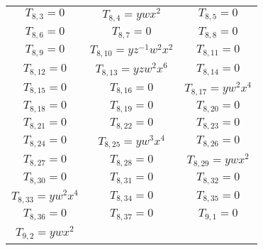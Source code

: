 \documentclass[12pt]{memoireuqam1.3}
\begin{document}
\begin{longtable}{|c|c|c|}
$T_{8,3}= 0$&

$T_{8,4}= ywx^2$&

$T_{8,5}= 0$\\

$T_{8,6}= 0$&

$T_{8,7}= 0$&

$T_{8,8}= 0$\\

$T_{8,9}= 0$&

$T_{8,10}= yz^{-1}w^2x^2$&

$T_{8,11}= 0$\\

$T_{8,12}= 0$&

$T_{8,13}= yzw^2x^6$&

$T_{8,14}= 0$\\

$T_{8,15}= 0$&

$T_{8,16}= 0$&

$T_{8,17}= yw^2x^4$\\

$T_{8,18}= 0$&

$T_{8,19}= 0$&

$T_{8,20}= 0$\\

$T_{8,21}= 0$&

$T_{8,22}= 0$&

$T_{8,23}= 0$\\

$T_{8,24}= 0$&

$T_{8,25}= yw^3x^4$&

$T_{8,26}= 0$\\

$T_{8,27}= 0$&

$T_{8,28}= 0$&

$T_{8,29}= ywx^2$\\

$T_{8,30}= 0$&

$T_{8,31}= 0$&

$T_{8,32}= 0$\\

$T_{8,33}= yw^2x^4$&

$T_{8,34}= 0$&

$T_{8,35}= 0$\\

$T_{8,36}= 0$&

$T_{8,37}= 0$&

$T_{9,1}= 0$\\

$T_{9,2}= ywx^2$&


\end{longtable}
\end{document}
